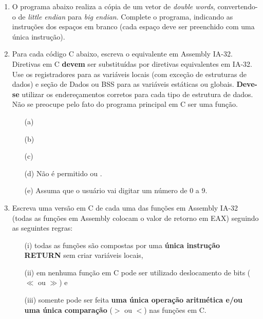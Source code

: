 \begin{enumerate}

    \item
    O programa abaixo realiza a cópia de um vetor de \textit{double words}, 
    convertendo-o de \textit{little endian} para \textit{big endian}.
    Complete o programa, indicando as instruções dos espaços em branco 
    (cada espaço deve ser preenchido com uma única instrução).

    \item
    Para cada código C abaixo, escreva o equivalente em Assembly IA-32.
    Diretivas em C \textbf{devem} ser substituídas por diretivas equivalentes em IA-32.
    Use os registradores para as variáveis locais (com exceção de estruturas de dados)
    e seção de Dados ou BSS para as variáveis estáticas ou globais.
    \textbf{Deve-se} utilizar os endereçamentos corretos 
    para cada tipo de estrutura de dados.
    Não se preocupe pelo fato do programa principal em C ser uma função.
    \begin{itemize}
        \item [(a)] 
        \item [(b)] 
        \item [(c)] 
        \item [(d)] Não é permitido  ou .
        \item [(e)] Assuma que o usuário vai digitar um número de 0 a 9.
    \end{itemize}

    \item
    Escreva uma versão em C de cada uma das funções em Assembly IA-32
    (todas as funções em Assembly colocam o valor de retorno em EAX)
    seguindo as seguintes regras:
    \begin{enumerate}
        \item [(i)]
        todas as funções são compostas por uma \textbf{única instrução RETURN}
        sem criar variáveis locais,
        
        \item [(ii)]
        em nenhuma função em C pode ser utilizado deslocamento de bits 
        ($\ll$ ou $\gg$) e

        \item [(iii)]
        somente pode ser feita \textbf{uma única operação aritmética 
        e/ou uma única comparação} ($>$ ou $<$) nas funções em C.
    \end{enumerate}


\end{enumerate}
